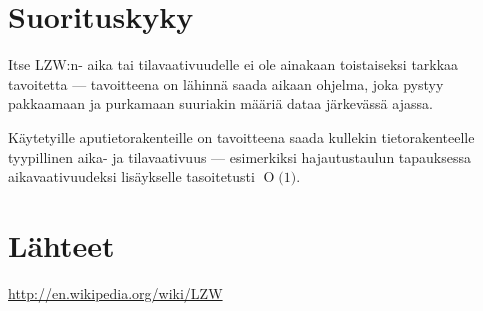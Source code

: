 \documentclass{article}
\newcommand{\BigO}[1]{\ensuremath{\operatorname{O}\bigl(#1\bigr)}}
\begin{document}
\section{Suorituskyky}
Itse LZW:n- aika tai tilavaativuudelle ei ole ainakaan toistaiseksi tarkkaa tavoitetta --- tavoitteena on lähinnä saada aikaan ohjelma, joka pystyy pakkaamaan ja purkamaan suuriakin määriä dataa järkevässä ajassa.

Käytetyille aputietorakenteille on tavoitteena saada kullekin tietorakenteelle tyypillinen aika- ja tilavaativuus --- esimerkiksi hajautustaulun tapauksessa aikavaativuudeksi lisäykselle tasoitetusti \BigO{1}.

\section{Lähteet}
\url{http://en.wikipedia.org/wiki/LZW}
\end{document}
